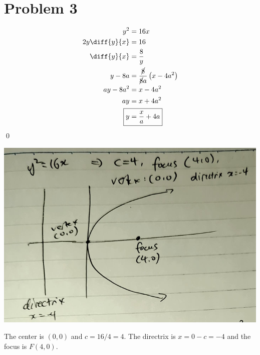 \documentclass{article}
\begin{document}
\section*{Problem 3}
\begin{itemize}
\begin{minipage}[t]{0.4\linewidth}
	\item[(a)]
		\begin{align*}
			y^2&=16x \\
			2y\diff{y}{x}&=16 \\
			\diff{y}{x}&=\frac{8}{y} \\
			y-8a&=\frac{\cancel{8}}{\cancel{8}a}\left(x-4a^2\right) \\
			ay-8a^2&=x-4a^2 \\
			ay&=x+4a^2 \\
			\Aboxed{y&=\frac{x}{a}+4a}
		\end{align*}
		\qed
\end{minipage}
\begin{minipage}[t]{0.6\linewidth}
	\item[(b)]
		\phantom{}

		\hspace*{5pt}\includegraphics*[width=0.9\linewidth]{q3b.png}
\end{minipage}

\item[(c)]
The center is $(0,0)$ and $c=16/4=4$. The directrix is $x=0-c=-4$ and the focus is $F(4,0)$.


\end{itemize}
\end{document}
